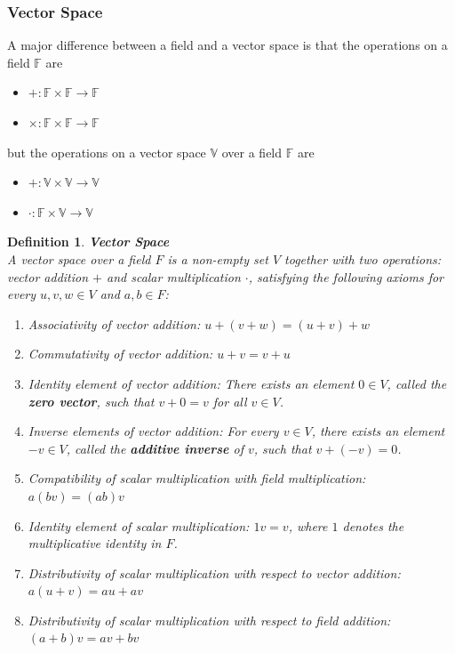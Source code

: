 \documentclass[11pt]{book} %
\newtheorem{definition}{Definition}[section]
\begin{document}
\subsubsection{Vector Space}

A major difference between a field and a vector space is that the operations on a field \( \mathbb{F} \) are
\begin{itemize}
    \item \( +: \mathbb{F} \times \mathbb{F} \to \mathbb{F} \)
    \item \( \times: \mathbb{F} \times \mathbb{F} \to \mathbb{F} \)
\end{itemize}

but the operations on a vector space \( \mathbb{V} \) over a field \( \mathbb{F} \) are
\begin{itemize}
    \item \( +: \mathbb{V} \times \mathbb{V} \to \mathbb{V} \)
    \item \( \cdot: \mathbb{F} \times \mathbb{V} \to \mathbb{V} \)
\end{itemize}

\bigbreak

\begin{definition}{\textbf{Vector Space}} \\
    A vector space over a field \( F \) is a non-empty set \( V \) together with two operations: vector addition \( + \) and scalar multiplication \( \cdot \), satisfying the following axioms for every \( u, v, w \in V \) and \( a, b \in F \):
    \begin{enumerate}
        \item Associativity of vector addition: \( u + (v + w) = (u + v) + w \)
        \item Commutativity of vector addition: \( u + v = v + u \)
        \item Identity element of vector addition: There exists an element \( 0 \in V \), called the \textbf{zero vector}, such that \( v + 0 = v \) for all \( v \in V \).
        \item Inverse elements of vector addition: For every \( v \in V \), there exists an element \( -v \in V \), called the \textbf{additive inverse} of \( v \), such that \( v + (-v) = 0 \).
        \item Compatibility of scalar multiplication with field multiplication: \( a(bv) = (ab)v \)
        \item Identity element of scalar multiplication: \( 1v = v \), where \( 1 \) denotes the multiplicative identity in \( F \).
        \item Distributivity of scalar multiplication with respect to vector addition: \( a(u + v) = au + av \)
        \item Distributivity of scalar multiplication with respect to field addition: \( (a + b)v = av + bv \)
    \end{enumerate}
\end{definition}
\end{document}
